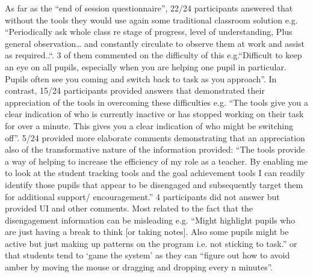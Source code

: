 {{As far as the “end of session questionnaire”, 22/24 participants
answered that without the tools they would use again some traditional
classroom solution e.g. “Periodically ask whole class re stage of
progress, level of understanding, Plus general observation… and
constantly circulate to observe them at work and assist as
required..“. 3 of them commented on the difficulty of this
e.g.“Difficult to keep an eye on all pupils, especially when you are
helping one pupil in particular. Pupils often see you coming and
switch back to task as you approach”. In contrast, 15/24 participants
provided answers that demonstrated their appreciation of the tools in
overcoming these difficulties e.g. “The tools give you a clear
indication of who is currently inactive or has stopped working on
their task for over a minute. This gives you a clear indication of who
might be switching off”. 5/24 provided more elaborate comments
demonstrating that an appreciation also of the transformative nature
of the information provided: “The tools provide a way of helping to
increase the efficiency of my role as a teacher. By enabling me to
look at the student tracking tools and the goal achievement tools I
can readily identify those pupils that appear to be disengaged and
subsequently target them for additional support/ encouragement.” 4
participants did not answer but provided UI and other comments. Most
related to the fact that the disengagement information can be
misleading e.g. “Might highlight pupils who are just having a break to
think [or taking notes]. Also some pupils might be active but just
making up patterns on the program i.e. not sticking to task.” or that
students tend to ‘game the system’ as they can “figure out how to
avoid amber by moving the mouse or dragging and dropping every n
minutes”.   

}}
